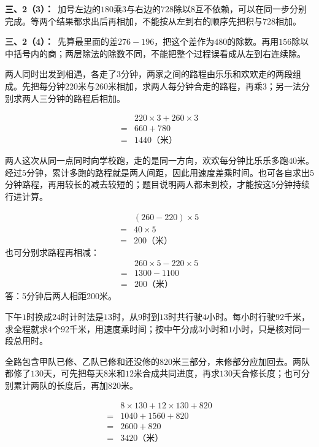 \documentclass[multi=snippet,border=0pt]{standalone}
\newenvironment{snippet}[3]{\begin{minipage}{#1bp}\color{answerred}\fontsize{#2}{#3}\selectfont\raggedright}{\end{minipage}}
\begin{document}
\begin{snippet}{505}{11.5}{14}\textbf{三、2（3）：}\ 加号左边的\(180\)乘\(3\)与右边的\(728\)除以\(8\)互不依赖，可以在同一步分别完成。等两个结果都求出后再相加，不能按从左到右的顺序先把积与\(728\)相加。\end{snippet}
\begin{snippet}{505}{11.5}{14}\textbf{三、2（4）：}\ 先算最里面的差\(276-196\)，把这个差作为\(480\)的除数。再用\(156\)除以中括号内的商；两层除法的除数不同，不能把整个过程误看成从左到右连续除。\end{snippet}
\begin{snippet}{505}{11.5}{14}两人同时出发到相遇，各走了\(3\)分钟，两家之间的路程由乐乐和欢欢走的两段组成。先把每分钟\(220\)米与\(260\)米相加，求两人每分钟合走的路程，再乘\(3\)；另一法分别求两人三分钟的路程后相加。\par \[\begin{aligned}&220\times3+260\times3\\={}&660+780\\={}&1440\text{（米）}\end{aligned}\]\end{snippet}
\begin{snippet}{505}{11.5}{14}两人这次从同一点同时向学校跑，走的是同一方向，欢欢每分钟比乐乐多跑\(40\)米。经过\(5\)分钟，累计多跑的路程就是两人间距，因此用速度差乘时间。也可各自求出\(5\)分钟路程，再用较长的减去较短的；题目说明两人都未到校，才能按这\(5\)分钟持续行进计算。\par \[\begin{aligned}&(260-220)\times5\\={}&40\times5\\={}&200\text{（米）}\end{aligned}\]也可分别求路程再相减：\[\begin{aligned}&260\times5-220\times5\\={}&1300-1100\\={}&200\text{（米）}\end{aligned}\]答：5分钟后两人相距200米。\end{snippet}
\begin{snippet}{505}{11.5}{14}下午\(1\)时换成\(24\)时计时法是\(13\)时，从\(9\)时到\(13\)时共行驶\(4\)小时。每小时行驶\(92\)千米，求全程就求\(4\)个\(92\)千米，用速度乘时间；按中午分成\(3\)小时和\(1\)小时，只是核对同一段总用时。\end{snippet}
\begin{snippet}{505}{11.5}{14}全路包含甲队已修、乙队已修和还没修的\(820\)米三部分，未修部分应加回去。两队都修了\(130\)天，可先把每天\(8\)米和\(12\)米合成共同进度，再求\(130\)天合修长度；也可分别累计两队的长度后，再加\(820\)米。\par \[\begin{aligned}&8\times130+12\times130+820\\={}&1040+1560+820\\={}&2600+820\\={}&3420\text{（米）}\end{aligned}\]\end{snippet}
\end{document}
